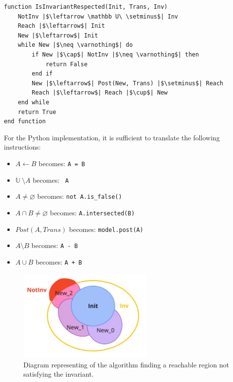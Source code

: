 \documentclass[12pt]{article}
\begin{document}
    \begin{verbatim}
function IsInvariantRespected(Init, Trans, Inv)
    NotInv |$\leftarrow \mathbb U\ \setminus$| Inv
    Reach |$\leftarrow$| Init
    New |$\leftarrow$| Init
    while New |$\neq \varnothing$| do
        if New |$\cap$| NotInv |$\neq \varnothing$| then
            return False
        end if
        New |$\leftarrow$| Post(New, Trans) |$\setminus$| Reach
        Reach |$\leftarrow$| Reach |$\cup$| New
    end while
    return True
end function
    \end{verbatim}
    For the Python implementation, it is sufficient to translate the following instructions:
    \begin{itemize}
        \item $A \leftarrow B$ becomes: \texttt{A = B}
        \item $\mathbb U\ \setminus A$ becomes: \texttt{~A}
        \item $A \neq \varnothing$ becomes: \texttt{not A.is_false()}
        \item $A \cap B \neq \varnothing$ becomes: \texttt{A.intersected(B)}
        \item $Post(A, Trans)$ becomes: \texttt{model.post(A)}
        \item $A \setminus B$ becomes: \texttt{A - B}
        \item $A \cup B$ becomes: \texttt{A + B}
    \end{itemize}

    \begin{figure}[H] 
        \centering
        \includegraphics[width=0.6\textwidth]{reach-diagram.png}
        \caption{Diagram representing of the algorithm finding a reachable region not satisfying the invariant.}
        \label{fig:reach_diagram}
    \end{figure}
\end{document}
